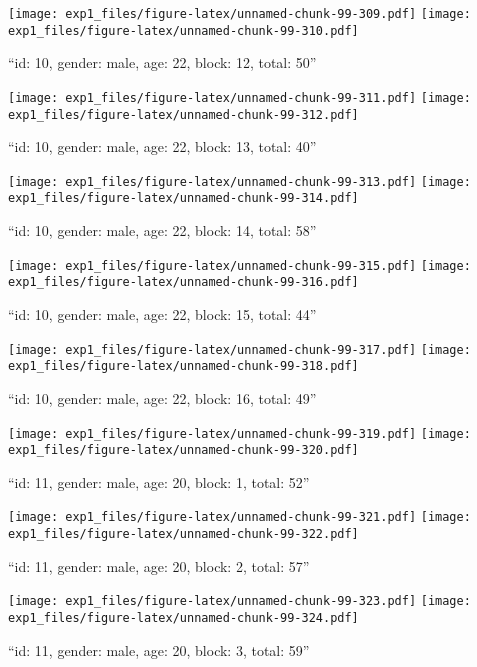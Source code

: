 \documentclass[,]{article}
\begin{document}
\texttt{[image: exp1\_files/figure-latex/unnamed-chunk-99-309.pdf]}
\texttt{[image: exp1\_files/figure-latex/unnamed-chunk-99-310.pdf]}

\newpage
[1] 

``id: 10, gender: male, age: 22, block: 12, total: 50''

\texttt{[image: exp1\_files/figure-latex/unnamed-chunk-99-311.pdf]}
\texttt{[image: exp1\_files/figure-latex/unnamed-chunk-99-312.pdf]}

\newpage
[1] 

``id: 10, gender: male, age: 22, block: 13, total: 40''

\texttt{[image: exp1\_files/figure-latex/unnamed-chunk-99-313.pdf]}
\texttt{[image: exp1\_files/figure-latex/unnamed-chunk-99-314.pdf]}

\newpage
[1] 

``id: 10, gender: male, age: 22, block: 14, total: 58''

\texttt{[image: exp1\_files/figure-latex/unnamed-chunk-99-315.pdf]}
\texttt{[image: exp1\_files/figure-latex/unnamed-chunk-99-316.pdf]}

\newpage
[1] 

``id: 10, gender: male, age: 22, block: 15, total: 44''

\texttt{[image: exp1\_files/figure-latex/unnamed-chunk-99-317.pdf]}
\texttt{[image: exp1\_files/figure-latex/unnamed-chunk-99-318.pdf]}

\newpage
[1] 

``id: 10, gender: male, age: 22, block: 16, total: 49''

\texttt{[image: exp1\_files/figure-latex/unnamed-chunk-99-319.pdf]}
\texttt{[image: exp1\_files/figure-latex/unnamed-chunk-99-320.pdf]}

\newpage
[1] 

``id: 11, gender: male, age: 20, block: 1, total: 52''

\texttt{[image: exp1\_files/figure-latex/unnamed-chunk-99-321.pdf]}
\texttt{[image: exp1\_files/figure-latex/unnamed-chunk-99-322.pdf]}

\newpage
[1] 

``id: 11, gender: male, age: 20, block: 2, total: 57''

\texttt{[image: exp1\_files/figure-latex/unnamed-chunk-99-323.pdf]}
\texttt{[image: exp1\_files/figure-latex/unnamed-chunk-99-324.pdf]}

\newpage
[1] 

``id: 11, gender: male, age: 20, block: 3, total: 59''
\end{document}
